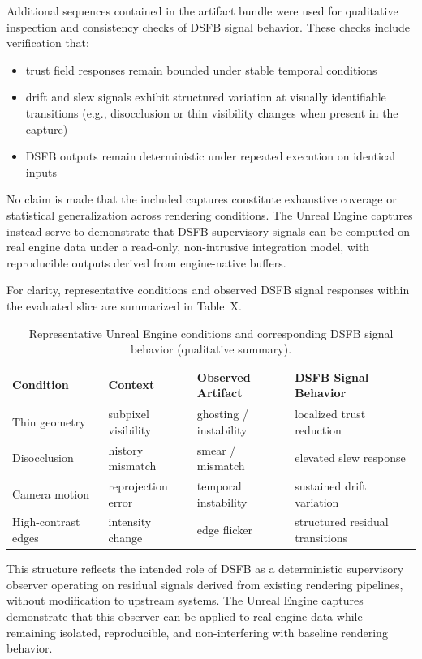 \documentclass[11pt,letterpaper]{article}
\theoremstyle{gcresult}
\theoremstyle{definition}
\begin{document}
Additional sequences contained in the artifact bundle were used for qualitative inspection and consistency checks of DSFB signal behavior. These checks include verification that:
\begin{itemize}
    \item trust field responses remain bounded under stable temporal conditions
    \item drift and slew signals exhibit structured variation at visually identifiable transitions (e.g., disocclusion or thin visibility changes when present in the capture)
    \item DSFB outputs remain deterministic under repeated execution on identical inputs
\end{itemize}

No claim is made that the included captures constitute exhaustive coverage or statistical generalization across rendering conditions. The Unreal Engine captures instead serve to demonstrate that DSFB supervisory signals can be computed on real engine data under a read-only, non-intrusive integration model, with reproducible outputs derived from engine-native buffers.

For clarity, representative conditions and observed DSFB signal responses within the evaluated slice are summarized in Table~X.

\begin{table}[H]
\centering
\footnotesize
\caption{Representative Unreal Engine conditions and corresponding DSFB signal behavior (qualitative summary).}
\begin{tabular}{l l l l}
\hline
\footnotesize
\textbf{Condition} & \textbf{Context} & \textbf{Observed Artifact} & \textbf{DSFB Signal Behavior} \\
\hline

Thin geometry & subpixel visibility & ghosting / instability & localized trust reduction \\
Disocclusion & history mismatch & smear / mismatch & elevated slew response \\
Camera motion & reprojection error & temporal instability & sustained drift variation \\
High-contrast edges & intensity change & edge flicker & structured residual transitions \\
\hline
\end{tabular}
\end{table}

This structure reflects the intended role of DSFB as a deterministic supervisory observer operating on residual signals derived from existing rendering pipelines, without modification to upstream systems. The Unreal Engine captures demonstrate that this observer can be applied to real engine data while remaining isolated, reproducible, and non-interfering with baseline rendering behavior.
\end{document}
